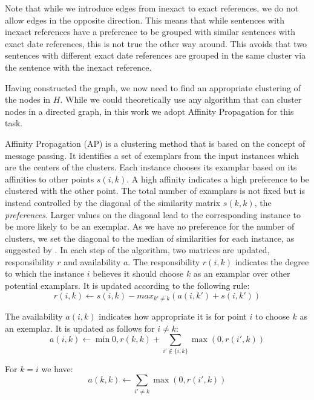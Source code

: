 \documentclass[a4paper,BCOR=10mm]{report}
\begin{document}
Note that while we introduce edges from inexact to exact references, we do not allow edges in the opposite direction. This means that while sentences with inexact references have a preference to be grouped with similar sentences with exact date references, this is not true the other way around.
This avoids that two sentences with different exact date references are grouped in the same cluster via the sentence with the inexact reference.

Having constructed the graph, we now need to find an appropriate clustering of the nodes in $H$. While we could theoretically use any algorithm that can cluster nodes in a directed graph, in this work we adopt Affinity Propagation for this task.

Affinity Propagation (AP) \citep{ap} is a clustering method that is based on the concept of message passing. It identifies a set of exemplars from the input instances which are the centers of the clusters. Each instance chooses its examplar based on its affinities to other points $s(i, k)$. A high affinity indicates a high preference to be clustered with the other point.
The total number of examplars is not fixed but is instead controlled by the diagonal of the similarity matrix $s(k, k)$, the \textit{preferences}. Larger values on the diagonal lead to the corresponding instance to be more likely to be an exemplar.
As we have no preference for the number of clusters, we set the diagonal to the median of similarities for each instance, as suggested by \citeauthor{ap}.
In each step of the algorithm, two matrices are updated, responsibility $r$ and availability $a$. The responsibility $r(i, k)$ indicates the degree to which the instance $i$ believes it should choose $k$ as an examplar over other potential examplars. It is updated according to the following rule:
\begin{displaymath}
r(i, k) \leftarrow s(i, k) - max_{k' \neq k}( a(i, k') + s(i, k') )
\end{displaymath}

The availability $a(i, k)$ indicates how appropriate it is for point $i$ to choose $k$ as an exemplar.
It is updated as follows for $i \neq k$:
\begin{displaymath}
a(i, k) \leftarrow \min 0, r(k, k) + \sum_{i' \not\in \{i, k\}} \max(0, r(i', k))
\end{displaymath}

For $k = i$ we have:
\begin{displaymath}
a(k, k) \leftarrow \sum_{i' \neq k} \max(0, r(i', k))
\end{displaymath}
\end{document}
